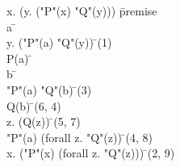 \documentclass{article}
\begin{document}
\begin{proofbox}
\: \forall x. (\forall y. ("P"(x) \rightarrow "Q"(y))) \= \hbox{premise} \\
\open
\: a \= \forallintroconst \\
\: \forall y. ("P"(a) \rightarrow "Q"(y)) \= \forallelim(1) \\
\open
\: P(a) \= \asm \\
\open
\: b \= \forallintroconst \\
\: "P"(a) \rightarrow "Q"(b) \= \forallelim(3) \\
\: Q(b) \= \implieselim(6, 4) \\
\close
\: \forall z. (Q(z)) \= \forallintro(5, 7) \\
\close
\: "P"(a) \rightarrow (forall z. "Q"(z)) \= \impliesintro(4, 8) \\
\close
\: \forall x. ("P"(x) \rightarrow (forall z. "Q"(z))) \= \forallintro(2, 9) \\
\end{proofbox}
\end{document}
